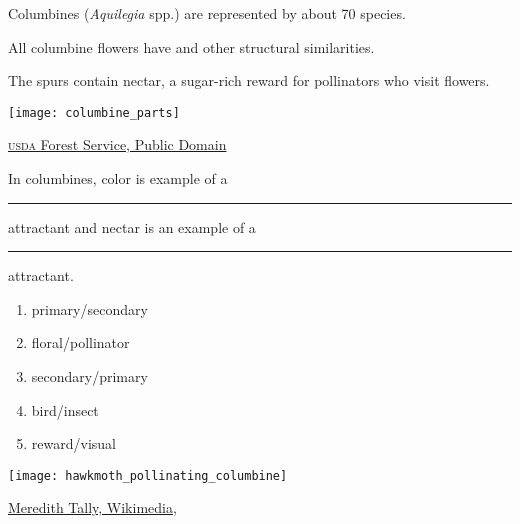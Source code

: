 \documentclass[t,handout]{beamer}  %
\newcommand{\ques}[1]{\highlight{\textsc{q#1:}}}
\begin{document}
%
\begin{frame}[t]{Columbines (\textit{Aquilegia} spp.) are represented by about 70 species.}
	
	\begin{multicols}{2}
	\hangpara All columbine flowers have  and other structural similarities.
	
	\hangpara The spurs contain nectar, a sugar-rich reward for pollinators who visit flowers.  

	\columnbreak
	
		\texttt{[image: columbine\_parts]}
	\end{multicols}
	
	\vfilll
	
	\hfill \tiny \href{https://www.fs.fed.us/wildflowers/beauty/columbines/flower.shtml}{\textsc{usda} Forest Service, Public Domain}
\end{frame}
%
\begin{frame}[t]{\ques7 In columbines, color is example of a \rule{0.5in}{0.4pt} attractant and nectar is an example of a \rule{0.5in}{0.4pt} attractant.}

	\begin{multicols}{2}
	\begin{enumerate}
		\item primary/secondary
		\item floral/pollinator
		\item \alert<2>{secondary/primary}
		\item bird/insect
		\item reward/visual
	\end{enumerate}

	\columnbreak
	
		\texttt{[image: hawkmoth\_pollinating\_columbine]}
	\end{multicols}
	
	\vfilll
	
	\hfill \tiny \href{https://commons.wikimedia.org/wiki/File:Whitelined_Sphinx_Hummingbird_Moth_Colorado.JPG}{Meredith Tally, Wikimedia, }
\end{frame}
%
\end{document}
